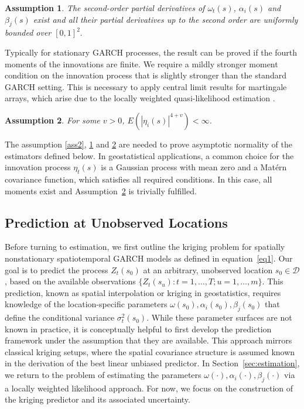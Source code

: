 \documentclass[fleqn,11pt]{article}
\newtheorem{assumption}{Assumption}
\begin{document}
\begin{assumption}\label{ass4} 
The second-order partial derivatives of $ \omega_t(s)$, $\alpha_i(s)$ and $\beta_j(s)$ exist and all their partial derivatives up to the second order are uniformly bounded over $[0,1]^2.$ 
\end{assumption}

Typically for stationary GARCH processes, the result can be proved if the fourth moments of the innovations are finite. 
We require a mildly stronger moment condition on the innovation process that is slightly stronger than the standard GARCH setting. This is necessary to apply central limit results for martingale arrays, which arise due to the locally weighted quasi-likelihood estimation \citep[cf.][, Theorem 3.2]{hall2014martingale}.

\begin{assumption}\label{ass5} 
For some $v>0$, $E\left(\left|\eta _i(s)\right|^{4+v}\right)<\infty$. 
\end{assumption}

The assumption \ref{ass2}, \ref{ass4} and \ref{ass5}  are needed to prove asymptotic normality of the estimators defined below. In geostatistical applications, a common choice for the innovation process $\eta_t(s)$ is a Gaussian process with mean zero and a Matérn covariance function, which satisfies all required conditions. In this case, all moments exist and Assumption~\ref{ass5} is trivially fulfilled.


\subsection{Prediction at Unobserved Locations}\label{sec:kriging}

Before turning to estimation, we first outline the kriging problem for spatially nonstationary spatiotemporal GARCH models as defined in equation~\eqref{eq1}. Our goal is to predict the process $Z_t(s_0)$ at an arbitrary, unobserved location $s_0 \in \mathcal{D}$, based on the available observations $\{Z_t(s_u): t = 1, \dots, T; u = 1, \dots, m\}$. This prediction, known as spatial interpolation or kriging in geostatistics, requires knowledge of the location-specific parameters $\omega(s_0), \alpha_i(s_0), \beta_j(s_0)$ that define the conditional variance $\sigma_t^2(s_0)$. While these parameter surfaces are not known in practice, it is conceptually helpful to first develop the prediction framework under the assumption that they are available. This approach mirrors classical kriging setups, where the spatial covariance structure is assumed known in the derivation of the best linear unbiased predictor. In Section~\ref{sec:estimation}, we return to the problem of estimating the parameters $\omega(\cdot), \alpha_i(\cdot), \beta_j(\cdot)$ via a locally weighted likelihood approach. For now, we focus on the construction of the kriging predictor and its associated uncertainty.
\end{document}
